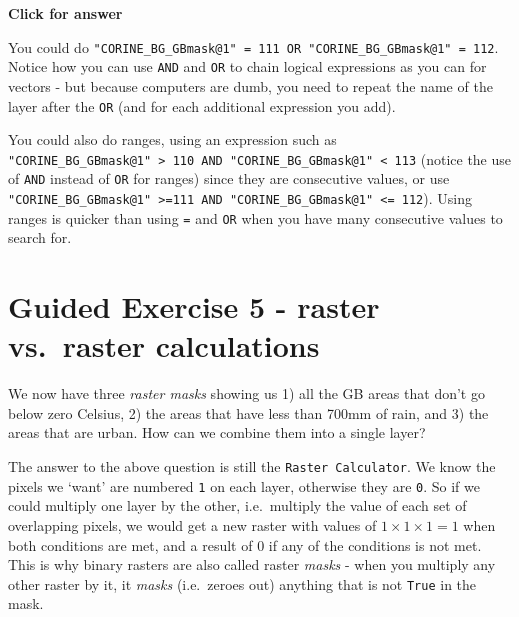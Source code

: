 \documentclass[
  letterpaper,
  DIV=11,
  numbers=noendperiod]{scrreprt}
\begin{document}
\begin{tcolorbox}[enhanced jigsaw, leftrule=.75mm, colframe=quarto-callout-important-color-frame, breakable, toprule=.15mm, bottomrule=.15mm, arc=.35mm, rightrule=.15mm, opacityback=0, colback=white, left=2mm]

\vspace{-3mm}\textbf{Click for answer}\vspace{3mm}

You could do
\texttt{"CORINE\_BG\_GBmask@1"\ =\ 111\ OR\ "CORINE\_BG\_GBmask@1"\ =\ 112}.
Notice how you can use \texttt{AND} and \texttt{OR} to chain logical
expressions as you can for vectors - but because computers are dumb, you
need to repeat the name of the layer after the \texttt{OR} (and for each
additional expression you add).

You could also do ranges, using an expression such as
\texttt{"CORINE\_BG\_GBmask@1"\ \textgreater{}\ 110\ AND\ "CORINE\_BG\_GBmask@1"\ \textless{}\ 113}
(notice the use of \texttt{AND} instead of \texttt{OR} for ranges) since
they are consecutive values, or use
\texttt{"CORINE\_BG\_GBmask@1"\ \textgreater{}=111\ AND\ "CORINE\_BG\_GBmask@1"\ \textless{}=\ 112}).
Using ranges is quicker than using \texttt{=} and \texttt{OR} when you
have many consecutive values to search for.

\end{tcolorbox}

\section{Guided Exercise 5 - raster vs.~raster
calculations}\label{guided-exercise-5---raster-vs.-raster-calculations}

We now have three \emph{raster masks} showing us 1) all the GB areas
that don't go below zero Celsius, 2) the areas that have less than 700mm
of rain, and 3) the areas that are urban. How can we combine them into a
single layer?

The answer to the above question is still the
\texttt{Raster\ Calculator}. We know the pixels we `want' are numbered
\texttt{1} on each layer, otherwise they are \texttt{0}. So if we could
multiply one layer by the other, i.e.~multiply the value of each set of
overlapping pixels, we would get a new raster with values of
\(1 \times 1 \times 1 = 1\) when both conditions are met, and a result
of \(0\) if any of the conditions is not met. This is why binary rasters
are also called raster \emph{masks} - when you multiply any other raster
by it, it \emph{masks} (i.e.~zeroes out) anything that is not
\texttt{True} in the mask.
\end{document}
